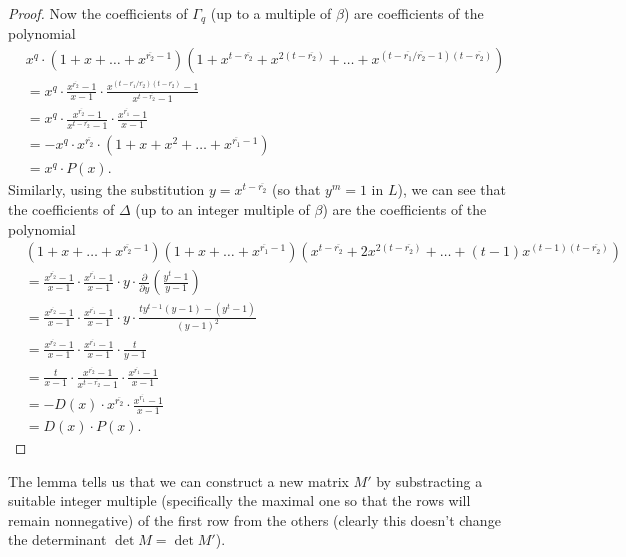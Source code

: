 \documentclass[12pt,a4paper]{article}
\theoremstyle{definition}
\newcommand{\uo}{\overline{r_2}}
\newcommand{\vo}{\overline{r_1}}
\begin{document}
\begin{proof}
Now the coefficients of $\Gamma_q$ (up to a multiple of $\beta$) are coefficients of the polynomial
\begin{equation*}\label{Gamma}
\begin{split}
&x^q\cdot(1+x+\dots+x^{\uo-1})(1+x^{t-\uo}+x^{2(t-\uo)}+\dots+x^{(t-\vo/\uo-1)(t-\uo)})\\
&=x^q\cdot\frac{x^{\uo}-1}{x-1}\cdot \frac{x^{(t-\vo/\uo)(t-\uo)}-1}{x^{t-\uo}-1}\\
&=x^q\cdot\frac{x^{\uo}-1}{x^{t-\uo}-1}\cdot \frac{x^{\vo}-1}{x-1}\\
&=-x^q\cdot x^{\uo}\cdot (1+x+x^2+\dots+x^{\vo-1})\\
&=x^q\cdot P(x).
\end{split}
\end{equation*}
Similarly, using the substitution $y=x^{t-\uo}$ (so that $y^m=1$ in $L$), we can see that the coefficients of $\Delta$ (up to an integer multiple of $\beta$) are the coefficients of the polynomial
\begin{equation*}\label{Delta}
\begin{split}
&(1+x+\dots+x^{\uo-1})(1+x+\dots+x^{\vo-1})(x^{t-\uo}+2x^{2(t-\uo)}+\dots+(t-1)x^{(t-1)(t-\uo)})\\
&=\frac{x^{\uo}-1}{x-1}\cdot \frac{x^{\vo}-1}{x-1}\cdot y \cdot \frac{\partial}{\partial y} \left(\frac{y^{t}-1}{y-1}\right)\\
&=\frac{x^{\uo}-1}{x-1}\cdot \frac{x^{\vo}-1}{x-1}\cdot y \cdot \frac{ty^{t-1}(y-1)-(y^t-1)}{(y-1)^2}\\
&=\frac{x^{\uo}-1}{x-1}\cdot \frac{x^{\vo}-1}{x-1} \cdot \frac{t}{y-1}\\
&=\frac{t}{x-1}\cdot \frac{x^{\uo}-1}{x^{t-\uo}-1}\cdot \frac{x^{\vo}-1}{x-1}\\
&=-D(x)\cdot x^{\uo}\cdot\frac{x^{\vo}-1}{x-1}\\
&=D(x)\cdot P(x).
\end{split}
\end{equation*}
\end{proof}

The lemma tells us that we can construct a new matrix $M'$ by substracting a suitable integer multiple (specifically the maximal one so that the rows will remain nonnegative) of the first row from the others (clearly this doesn't change the determinant $\det M=\det M'$).
\end{document}
